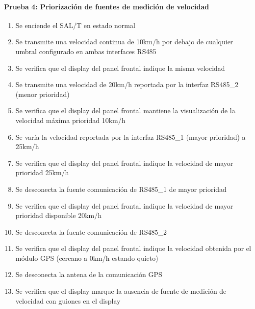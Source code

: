 \paragraph{Prueba 4: Priorización de fuentes de medición de velocidad}
\begin{enumerate}
\item	Se enciende el SAL/T en estado normal
\item	Se transmite una velocidad continua de 10km/h por debajo de cualquier umbral configurado en ambas interfaces RS485
\item	Se verifica que el display del panel frontal indique la misma velocidad
\item	Se transmite una velocidad de 20km/h reportada por la interfaz RS485\_2 (menor prioridad)
\item	Se verifica que el display del panel frontal mantiene la visualización de la velocidad máxima prioridad 10km/h
\item	Se varía la velocidad reportada por la interfaz RS485\_1 (mayor prioridad) a 25km/h
\item	Se verifica que el display del panel frontal indique la velocidad de mayor prioridad 25km/h
\item	Se desconecta la fuente comunicación de RS485\_1 de mayor prioridad
\item	Se verifica que el display del panel frontal indique la velocidad de mayor prioridad disponible 20km/h
\item	Se desconecta la fuente comunicación de RS485\_2 
\item	Se verifica que el display del panel frontal indique la velocidad obtenida por el módulo GPS (cercano a 0km/h estando quieto)
\item	Se desconecta la antena de la comunicación GPS
\item	Se verifica que el display marque la ausencia de fuente de medición de velocidad con guiones en el display

\end{enumerate}

